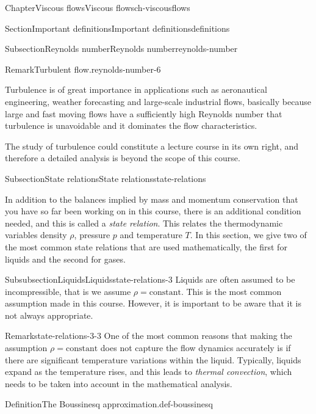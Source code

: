 \documentclass[oneside,10pt,]{book}
\numberwithin{equation}{section}
\begin{document}
\begin{chapterptx}{Chapter}{Viscous flows}{}{Viscous flows}{}{}{ch-viscousflows}
\begin{sectionptx}{Section}{Important definitions}{}{Important definitions}{}{}{definitions}
\begin{subsectionptx}{Subsection}{Reynolds number}{}{Reynolds number}{}{}{reynolds-number}
\begin{remark}{Remark}{Turbulent flow.}{reynolds-number-6}
\par
Turbulence is of great importance in applications such as aeronautical engineering, weather forecasting and large-scale industrial flows, basically because large and fast moving flows have a sufficiently high Reynolds number that turbulence is unavoidable and it dominates the flow characteristics.%
\par
The study of turbulence could constitute a lecture course in its own right, and therefore a detailed analysis is beyond the scope of this course.%
\end{remark}
\end{subsectionptx}
%
%
\typeout{************************************************}
\typeout{************************************************}
%
\begin{subsectionptx}{Subsection}{State relations}{}{State relations}{}{}{state-relations}
\begin{introduction}{}%
In addition to the balances implied by mass and momentum conservation that you have so far been working on in this course, there is an additional condition needed, and this is called a \emph{state relation}. This relates the thermodynamic variables density \(\rho\), pressure \(p\) and temperature \(T\). In this section, we give two of the most common state relations that are used mathematically, the first for liquids and the second for gases.%
\end{introduction}%
%
%
\typeout{************************************************}
\typeout{************************************************}
%
\begin{subsubsectionptx}{Subsubsection}{Liquids}{}{Liquids}{}{}{state-relations-3}
Liquids are often assumed to be incompressible, that is we assume \(\rho = \textrm{constant}\). This is the most common assumption made in this course. However, it is important to be aware that it is not always appropriate.%
\begin{remark}{Remark}{}{state-relations-3-3}%
One of the most common reasons that making the assumption \(\rho = \textrm{constant}\) does not capture the flow dynamics accurately is if there are significant temperature variations within the liquid. Typically, liquids expand as the temperature rises, and this leads to \emph{thermal convection}, which needs to be taken into account in the mathematical analysis.%
\end{remark}
\begin{definition}{Definition}{The Boussinesq approximation.}{}{def-boussinesq}%

\end{definition}
\end{subsubsectionptx}
\end{subsectionptx}
\end{sectionptx}
\end{chapterptx}
\end{document}

